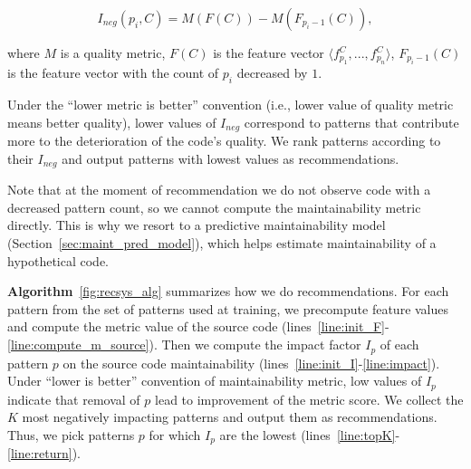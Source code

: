 \begin{equation} \label{eq:impact_factor} I_{\textit{neg}}(p_i, C) = M(F(C)) -
M(F_{p_{i} - 1}(C)), \end{equation}

where $M$ is a quality metric, $F(C)$ is the feature vector $\langle f^C_{p_1},
..., f^C_{p_n} \rangle$, $F_{p_{i} - 1}(C)$ is the feature vector with the count
of $p_i$ decreased by $1$.%


Under the ``lower metric is better'' convention (i.e., lower value of quality metric
means better quality), lower values of $I_{\textit{neg}}$ correspond to patterns
that contribute more to the deterioration of the code's quality. We rank patterns
according to their $I_{\textit{neg}}$ and output patterns with lowest values as
recommendations.

Note that at the moment of recommendation we do not observe code with a
decreased pattern count, so we cannot compute the maintainability metric
directly. This is why we resort to a predictive maintainability model
(Section~\ref{sec:maint_pred_model}), which helps estimate maintainability of a
hypothetical code.



\textbf{Algorithm}~\ref{fig:recsys_alg} summarizes how we do recommendations.
For each pattern from the set of patterns used at training, we
precompute feature values and compute the metric value of the source code
(lines~\ref{line:init_F}-\ref{line:compute_m_source}). Then we compute the
impact factor $I_p$ of each pattern $p$ on the source code maintainability
(lines~\ref{line:init_I}-\ref{line:impact}). Under ``lower is better''
convention of maintainability metric, low values of $I_p$ indicate that removal
of $p$ lead to improvement of the metric score. We collect the $K$ most
negatively impacting patterns and output them as recommendations. Thus, we
pick patterns $p$ for which $I_p$ are the lowest
(lines~\ref{line:topK}-\ref{line:return}).

